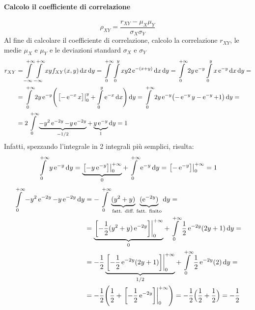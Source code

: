 \begin{esempio}
\paragraph{Calcolo il coefficiente di correlazione}
\[
	\rho_{XY} = \frac{r_{XY} - \mu_X \mu_Y}{\sigma_X \sigma_Y}
\]
Al fine di calcolare il coefficiente di correlazione, calcolo la correlazione
$r_{XY}$, le medie $\mu_X$ e $\mu_Y$ e le deviazioni standard $\sigma_X$ e $\sigma_Y$
\begin{align*}
	r_{XY} &= \intinf{\intinf{xy f_{XY} (x,y)}{x}}{y} =
	\intd{0}{+\infty}{\intd{0}{y}{xy 2\e{-(x+y)}}{x}}{y} =
	\intd{0}{+\infty}{2y \e{-y} \intd{0}{y}{x \e{-y}}{x}}{y} = \\
	&= \intd{0}{+\infty}{2y\e{-y} \Biggl( \bound{0}{y}{-\e{-x}x} + \intd{0}{y}{\e{-x}}{x} \Biggr)}{y} =
	\intd{0}{+\infty}{2y\e{-y} \bigl(-\e{-y}y -\e{-y} +1\bigr)}{y} = \\
	&= 2\intd{0}{+\infty}{\underbrace{-y^2\e{-2y}-y\e{-2y}}_{- 1/2} + \underbrace{y\e{-y}}_1}{y} = 1
\end{align*}
Infatti, spezzando l'integrale in 2 integrali più semplici, risulta:
\[
	\intd{0}{+\infty}{y\e{-y}}{y} =
	\underbrace{\bound{0}{+\infty}{-y\e{-y}}}_0 + \intd{0}{+\infty}{\e{-y}}{y} =
	\bound{0}{+\infty}{-\e{-y}} = 1
\]
\begin{align*}
	\intd{0}{+\infty}{-y^2\e{-2y} -y\e{-2y}}{y} &= -\intd{0}{+\infty}{\underbrace{(y^2+y)}_{\text{fatt. diff.}} \underbrace{(\e{-2y})}_{\text{fatt. finito}}}{y} = \\
	&= \underbrace{\bound{0}{+\infty}{-\frac{1}{2}(y^2 +y)\e{-2y}}}_0 + \intd{0}{+\infty}{\frac{1}{2}\e{-2y}(2y+1)}{y} = \\
	&= -\frac{1}{2} \underbrace{\bound{0}{+\infty}{-\frac{1}{2}\e{-2y}(2y+1)}}_{1/2} + \intd{0}{+\infty}{\frac{1}{2}\e{-2y}(2)}{y} = \\
	&= -\frac{1}{2} \Biggl( \frac{1}{2} + \bound{0}{+\infty}{-\frac{1}{2}\e{-2y}} \Biggr) = -\frac{1}{2} \Bigl(\frac{1}{2} + \frac{1}{2}\Bigr) = -\frac{1}{2}
\end{align*}


\end{esempio}
